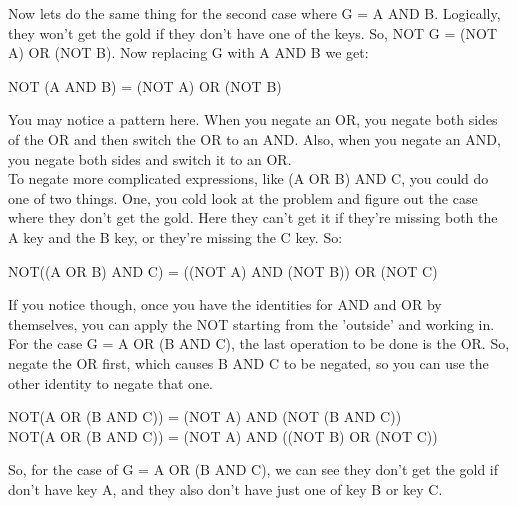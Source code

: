 Now lets do the same thing for the second case where G = A AND B. Logically, they won't get the gold if they don't have one of the keys. So, NOT G = (NOT A) OR (NOT B). Now replacing G with A AND B we get:

\begin{center}
	NOT (A AND B) = (NOT A) OR (NOT B)
\end{center}

\begin{center} \end{center}

You may notice a pattern here. When you negate an OR, you negate both sides of the OR and then switch the OR to an AND. Also, when you negate an AND, you negate both sides and switch it to an OR.\\

To negate more complicated expressions, like (A OR B) AND C, you could do one of two things. One, you cold look at the problem and figure out the case where they don't get the gold. Here they can't get it if they're missing both the A key and the B key, or they're missing the C key. So:

\begin{center}
	NOT((A OR B) AND C) = ((NOT A) AND (NOT B)) OR (NOT C)
\end{center}

If you notice though, once you have the identities for AND and OR by themselves, you can apply the NOT starting from the 'outside' and working in. For the case G = A OR (B AND C), the last operation to be done is the OR. So, negate the OR first, which causes B AND C to be negated, so you can use the other identity to negate that one.

\begin{center}
	NOT(A OR (B AND C)) = (NOT A) AND (NOT (B AND C))\\
	
	NOT(A OR (B AND C)) = (NOT A) AND ((NOT B) OR (NOT C))
\end{center}

So, for the case of G = A OR (B AND C), we can see they don't get the gold if don't have key A, and they also don't have just one of key B or key C.\\